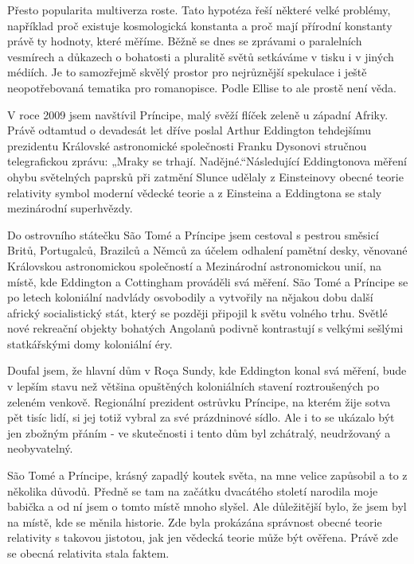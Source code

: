   Přesto popularita multiverza roste. Tato hypotéza řeší některé velké problémy, například proč
  existuje kosmologická konstanta a proč mají přírodní konstanty právě ty hodnoty, které měříme.
  Běžně se dnes se zprávami o paralelních vesmírech a důkazech o bohatosti a pluralitě světů
  setkáváme v tisku i v jiných médiích. Je to samozřejmě skvělý prostor pro nejrůznější spekulace i
  ještě neopotřebovaná tematika pro romanopisce. Podle Ellise to ale prostě není věda. 
  
  V roce 2009 jsem navštívil Príncipe, malý svěží flíček zeleně u západní Afriky. Právě odtamtud o
  devadesát let dříve poslal Arthur Eddington tehdejšímu prezidentu Královské astronomické
  společnosti Franku Dysonovi stručnou telegrafickou zprávu: „Mraky se trhají. Nadějné.“Následující
  Eddingtonova měření ohybu světelných paprsků při zatmění Slunce udělaly z Einsteinovy obecné
  teorie relativity symbol moderní vědecké teorie a z Einsteina a Eddingtona se staly mezinárodní
  superhvězdy. 
  
  Do ostrovního státečku São Tomé a Príncipe jsem cestoval s pestrou směsicí Britů, Portugalců,
  Brazilců a Němců za účelem odhalení pamětní desky, věnované Královskou astronomickou společností a
  Mezinárodní astronomickou unií, na místě, kde Eddington a Cottingham prováděli svá měření. São
  Tomé a Príncipe se po letech koloniální nadvlády osvobodily a vytvořily na nějakou dobu další
  africký socialistický stát, který se později připojil k světu volného trhu. Světlé nové rekreační
  objekty bohatých Angolanů podivně kontrastují s velkými sešlými statkářskými domy koloniální éry.
  
  Doufal jsem, že hlavní dům v Roça Sundy, kde Eddington konal svá měření, bude v lepším stavu než
  většina opuštěných koloniálních stavení roztroušených po zeleném venkově. Regionální prezident
  ostrůvku Príncipe, na kterém žije sotva pět tisíc lidí, si jej totiž vybral za své prázdninové
  sídlo. Ale i to se ukázalo být jen zbožným přáním - ve skutečnosti i tento dům byl zchátralý,
  neudržovaný a neobyvatelný. 
  
  São Tomé a Príncipe, krásný zapadlý koutek světa, na mne velice zapůsobil a to z několika důvodů.
  Předně se tam na začátku dvacátého století narodila moje babička a od ní jsem o tomto místě mnoho
  slyšel. Ale důležitější bylo, že jsem byl na místě, kde se měnila historie. Zde byla prokázána
  správnost obecné teorie relativity s takovou jistotou, jak jen vědecká teorie může být ověřena.
  Právě zde se obecná relativita stala faktem. 
  
